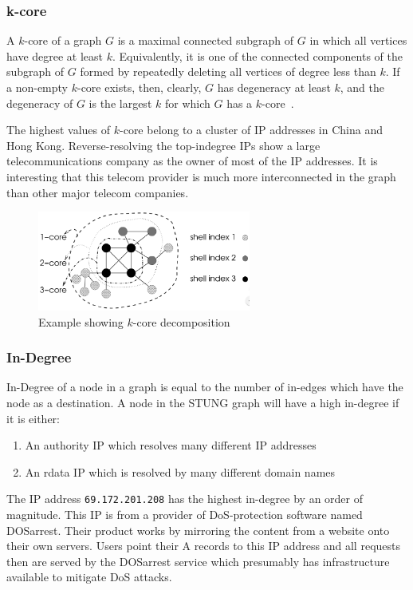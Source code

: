 \documentclass{acm_proc_article-sp}
\begin{document}
\subsubsection{k-core}
A $k$-core of a graph $G$ is a maximal connected subgraph of $G$ in which all vertices have degree at least $k$. Equivalently, it is one of the connected components of the subgraph of $G$ formed by repeatedly deleting all vertices of degree less than $k$. If a non-empty $k$-core exists, then, clearly, $G$ has degeneracy at least $k$, and the degeneracy of $G$ is the largest $k$ for which $G$ has a $k$-core~\cite{wiki:kcore}.

The highest values of $k$-core belong to a cluster of IP addresses in China and Hong Kong. Reverse-resolving the top-indegree IPs show a large telecommunications company as the owner of most of the IP addresses. It is interesting that this telecom provider is much more interconnected in the graph than other major telecom companies.

\begin{figure}[ht!]
\centering
\includegraphics[width=70mm]{images/kcore.png}
\caption{Example showing $k$-core decomposition~\cite{alvarez2005k} \label{overflow}}
\end{figure}


\subsubsection{In-Degree}
In-Degree of a node in a graph is equal to the number of in-edges which have the node as a destination. A node in the STUNG graph will have a high in-degree if it is either:
\begin{enumerate}
    \item An authority IP which resolves many different IP addresses
    \item An rdata IP which is resolved by many different domain names
\end{enumerate}  

The IP address \texttt{69.172.201.208} has the highest in-degree by an order of magnitude. This IP is from a provider of DoS-protection software named DOSarrest. Their product works by mirroring the content from a website onto their own servers. Users point their A records to this IP address and all requests then are served by the DOSarrest service which presumably has infrastructure available to mitigate DoS attacks.
\end{document}
